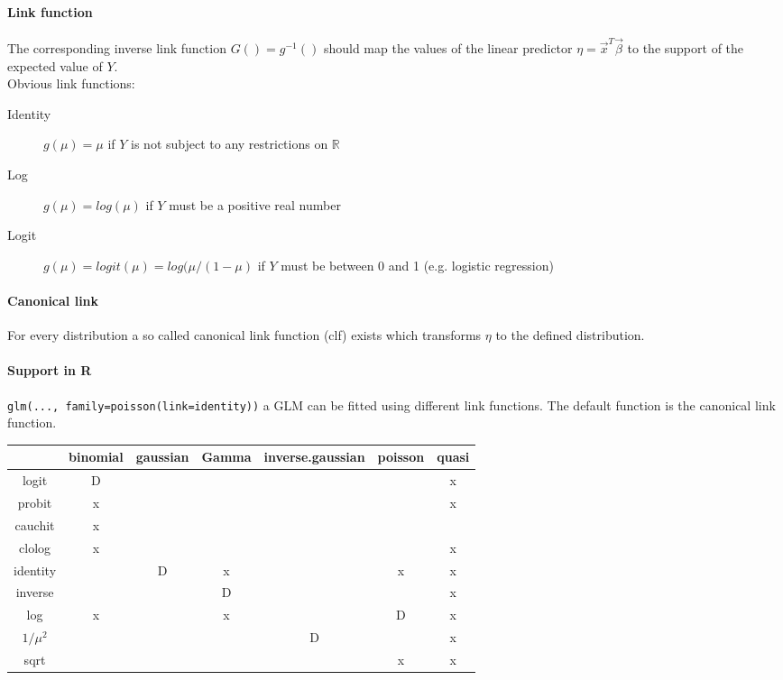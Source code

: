 \paragraph{Link function}
The corresponding inverse link function $G() = g^{-1}()$ should map the values of the linear predictor $\eta = \vec{x}^T \vec{\beta}$ to the support of the expected value of $Y$.\\
Obvious link functions:
\begin{description}
	\item[Identity] $g(\mu) = \mu$ if $Y$ is not subject to any restrictions on $\mathbb{R}$
	\item[Log] $g(\mu) = log(\mu)$ if $Y$ must be a positive real number
	\item[Logit] $g(\mu) = logit(\mu)=log(\mu/(1-\mu)$ if $Y$ must be between 0 and 1 (e.g. logistic regression)
\end{description}

\paragraph{Canonical link}
For every distribution a so called canonical link function (clf) exists which transforms $\eta$ to the defined distribution.

\paragraph{Support in R}
\lstinline{glm(..., family=poisson(link=identity))} a GLM can be fitted using different link functions. The default function is the canonical link function.

\begin{tabular}{c|cccccc}
	& binomial & gaussian & Gamma & inverse.gaussian & poisson & quasi \\
	\hline 
	logit & D & & & & & x \\
	probit & x & & & & & x \\
	cauchit & x & & & & &  \\
	clolog & x & & & & & x \\
	identity & & D & x & & x & x \\
	inverse & & & D & & & x \\
	log & x & & x & & D & x \\
	$1/\mu^2$ & & & & D & & x \\
	sqrt & & & & & x & x \\
\end{tabular}

